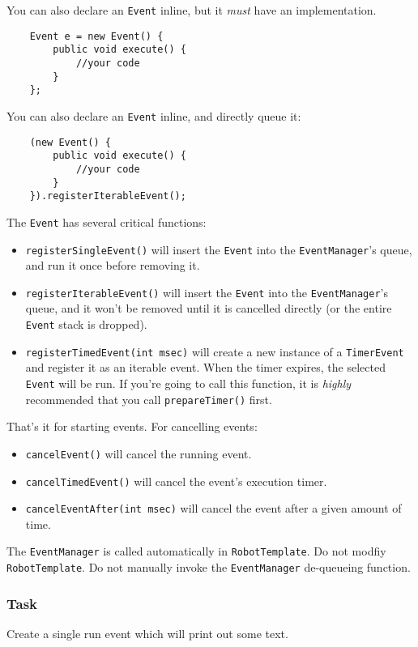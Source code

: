 \documentclass[a4paper]{article}
\begin{document}
You can also declare an \lstinline{Event} inline, but it \textit{must} have an implementation.

\begin{lstlisting}
	Event e = new Event() {
		public void execute() {
			//your code
		}
	};
\end{lstlisting}

You can also declare an \lstinline{Event} inline, and directly queue it:

\begin{lstlisting}
	(new Event() {
		public void execute() {
			//your code
		}
	}).registerIterableEvent();
\end{lstlisting}

The \lstinline{Event} has several critical functions:
\begin{itemize}\item{\lstinline{registerSingleEvent()} will insert the \lstinline{Event} into the \lstinline{EventManager}'s queue, and run it once before removing it.}\item{\lstinline{registerIterableEvent()} will insert the \lstinline{Event} into the \lstinline{EventManager}'s queue, and it won't be removed until it is cancelled directly (or the entire \lstinline{Event} stack is dropped).}\item{\lstinline{registerTimedEvent(int msec)} will create a new instance of a \lstinline{TimerEvent} and register it as an iterable event. When the timer expires, the selected \lstinline{Event} will be run. If you're going to call this function, it is \textit{highly} recommended that you call \lstinline{prepareTimer()} first.}\end{itemize}

That's it for starting events. For cancelling events: \begin{itemize}\item{\lstinline{cancelEvent()} will cancel the running event.}\item{\lstinline{cancelTimedEvent()} will cancel the event's execution timer.}\item{\lstinline{cancelEventAfter(int msec)} will cancel the event after a given amount of time.}\end{itemize}

The \lstinline{EventManager} is called automatically in \lstinline{RobotTemplate}. Do not modfiy \lstinline{RobotTemplate}. Do not manually invoke the \lstinline{EventManager} de-queueing function.
\subsubsection{Task} Create a single run event which will print out some text.
\end{document}
